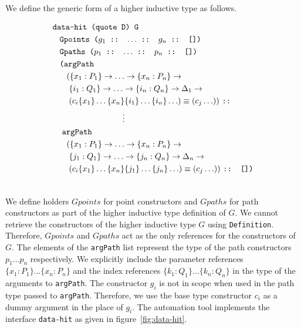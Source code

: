\documentclass[sigplan,10pt]{acmart}
\begin{document}
We define the generic form of a higher inductive type as follows.
\begin{center}
\begingroup
\fontsize{10pt}{0pt}\selectfont
\begin{align*}
& \texttt{data-hit (quote D) G}\\
  & \hspace {0.3cm} \texttt{Gpoints ($g_1$ :: $\ldots$ :: $g_n$ :: [])} \\
  & \hspace {0.3cm} \texttt{Gpaths ($p_1$ :: $\ldots$ :: $p_n$ :: [])} \\
  & \hspace {0.3cm} \texttt{(argPath} \\
  & \hspace {0.6cm} (\{x_1:P_1\} \rightarrow \ldots \rightarrow \{x_n:P_n\} \rightarrow \\
  & \hspace {0.7cm} \{i_1:Q_1\} \rightarrow \ldots \rightarrow \{i_n:Q_n\} \rightarrow \Delta_1 \rightarrow \\
  & \hspace {0.7cm} (c_i \{x_1\} \ldots \{x_n\} \{i_1\} \ldots \{i_n\} \ldots) \equiv (c_j \ldots))\ \texttt{::} \\
  & \hspace {3cm} \vdots \\
  & \hspace {0.4cm} \texttt{argPath} \\
  & \hspace {0.6cm} (\{x_1:P_1\} \rightarrow \ldots \rightarrow \{x_n:P_n\} \rightarrow \\
  & \hspace {0.7cm} \{j_1:Q_1\} \rightarrow \ldots \rightarrow \{j_n:Q_n\} \rightarrow \Delta_n \rightarrow \\
  & \hspace {0.7cm} (c_i \{x_1\} \ldots \{x_n\} \{j_1\} \ldots \{j_n\} \ldots) \equiv (c_j \ldots))\ \texttt{:: [])}\\ \nonumber
\end{align*}
\endgroup
\end{center}
\normalsize

We define holders $Gpoints$ for point constructors and $Gpaths$ for path constructors as part of the higher inductive type definition of $G$. We cannot retrieve the constructors of the higher inductive type $G$ using {\tt Definition}. Therefore, $Gpoints$ and $Gpaths$ act as the only references for the constructors of $G$. The elements of the {\tt argPath} list represent the type of the path constructors $p_1 \ldots p_n$ respectively. We explicitly include the parameter references $\{x_1 : P_1\} \ldots \{x_n : P_n\}$ and the index references $\{k_1 : Q_1\} \ldots \{k_n : Q_n\}$ in the type of the arguments to {\tt argPath}. The constructor $g_i$ is not in scope when used in the path type passed to {\tt argPath}. Therefore, we use the base type constructor $c_i$ as a dummy argument in the place of $g_i$. The automation tool implements the interface {\tt data-hit} as given in figure~\ref{fig:data-hit}.
\end{document}
